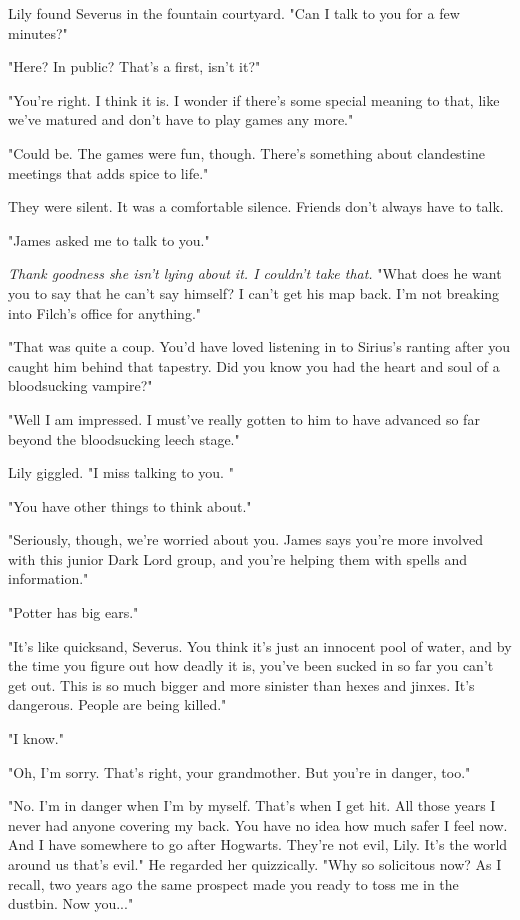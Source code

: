 Lily found Severus in the fountain courtyard. "Can I talk to you for a few minutes?"

"Here? In public? That's a first, isn't it?"

"You're right. I think it is. I wonder if there's some special meaning to that, like we've matured and don't have to play games any more."

"Could be. The games were fun, though. There's something about clandestine meetings that adds spice to life."

They were silent. It was a comfortable silence. Friends don't always have to talk.

"James asked me to talk to you."

\emph{Thank goodness she isn't lying about it. I couldn't take that.} "What does he want you to say that he can't say himself? I can't get his map back. I'm not breaking into Filch's office for anything."

"That was quite a coup. You'd have loved listening in to Sirius's ranting after you caught him behind that tapestry. Did you know you had the heart and soul of a bloodsucking vampire?"

"Well I am impressed. I must've really gotten to him to have advanced so far beyond the bloodsucking leech stage."

Lily giggled. "I miss talking to you. "

"You have other things to think about."

"Seriously, though, we're worried about you. James says you're more involved with this junior Dark Lord group, and you're helping them with spells and information."

"Potter has big ears."

"It's like quicksand, Severus. You think it's just an innocent pool of water, and by the time you figure out how deadly it is, you've been sucked in so far you can't get out. This is so much bigger and more sinister than hexes and jinxes. It's dangerous. People are being killed."

"I know."

"Oh, I'm sorry. That's right, your grandmother. But you're in danger, too."

"No. I'm in danger when I'm by myself. That's when I get hit. All those years I never had anyone covering my back. You have no idea how much safer I feel now. And I have somewhere to go after Hogwarts. They're not evil, Lily. It's the world around us that's evil." He regarded her quizzically. "Why so solicitous now? As I recall, two years ago the same prospect made you ready to toss me in the dustbin. Now you..."

